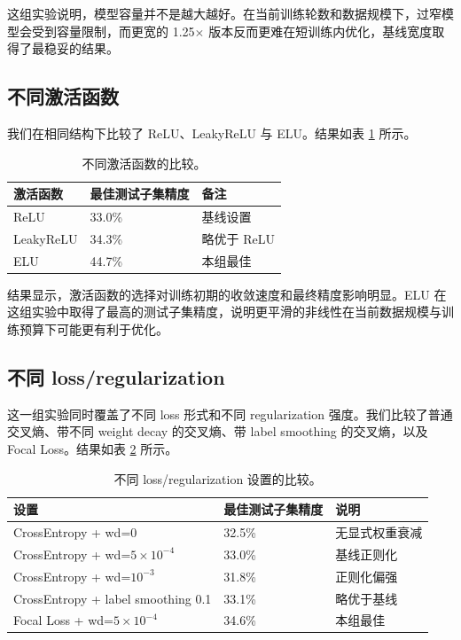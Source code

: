 \documentclass[11pt]{article}
\begin{document}
这组实验说明，模型容量并不是越大越好。在当前训练轮数和数据规模下，过窄模型会受到容量限制，而更宽的 1.25$\times$ 版本反而更难在短训练内优化，基线宽度取得了最稳妥的结果。

\subsection{不同激活函数}
我们在相同结构下比较了 ReLU、LeakyReLU 与 ELU。结果如表 \ref{tab:activation-ablation} 所示。

\begin{table}[H]
\centering
\caption{不同激活函数的比较。}
\label{tab:activation-ablation}
\begin{tabular}{lll}
\toprule
激活函数 & 最佳测试子集精度 & 备注 \\
\midrule
ReLU & 33.0\% & 基线设置 \\
LeakyReLU & 34.3\% & 略优于 ReLU \\
ELU & 44.7\% & 本组最佳 \\
\bottomrule
\end{tabular}
\end{table}

结果显示，激活函数的选择对训练初期的收敛速度和最终精度影响明显。ELU 在这组实验中取得了最高的测试子集精度，说明更平滑的非线性在当前数据规模与训练预算下可能更有利于优化。

\subsection{不同 loss/regularization}
这一组实验同时覆盖了不同 loss 形式和不同 regularization 强度。我们比较了普通交叉熵、带不同 weight decay 的交叉熵、带 label smoothing 的交叉熵，以及 Focal Loss。结果如表 \ref{tab:loss-ablation} 所示。

\begin{table}[H]
\centering
\caption{不同 loss/regularization 设置的比较。}
\label{tab:loss-ablation}
\begin{tabular}{lll}
\toprule
设置 & 最佳测试子集精度 & 说明 \\
\midrule
CrossEntropy + wd=0 & 32.5\% & 无显式权重衰减 \\
CrossEntropy + wd=$5\times10^{-4}$ & 33.0\% & 基线正则化 \\
CrossEntropy + wd=$10^{-3}$ & 31.8\% & 正则化偏强 \\
CrossEntropy + label smoothing 0.1 & 33.1\% & 略优于基线 \\
Focal Loss + wd=$5\times10^{-4}$ & 34.6\% & 本组最佳 \\
\bottomrule
\end{tabular}
\end{table}
\end{document}
